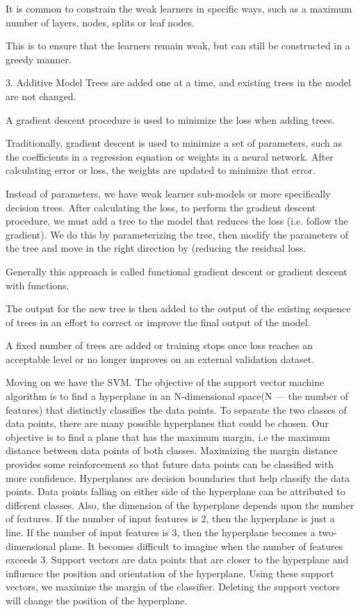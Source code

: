 \documentclass[12pt]{article}
\begin{document}
It is common to constrain the weak learners in specific ways, such as a maximum number of layers, nodes, splits or leaf nodes.

This is to ensure that the learners remain weak, but can still be constructed in a greedy manner.

3. Additive Model
Trees are added one at a time, and existing trees in the model are not changed.

A gradient descent procedure is used to minimize the loss when adding trees.

Traditionally, gradient descent is used to minimize a set of parameters, such as the coefficients in a regression equation or weights in a neural network. After calculating error or loss, the weights are updated to minimize that error.

Instead of parameters, we have weak learner sub-models or more specifically decision trees. After calculating the loss, to perform the gradient descent procedure, we must add a tree to the model that reduces the loss (i.e. follow the gradient). We do this by parameterizing the tree, then modify the parameters of the tree and move in the right direction by (reducing the residual loss.

Generally this approach is called functional gradient descent or gradient descent with functions.

The output for the new tree is then added to the output of the existing sequence of trees in an effort to correct or improve the final output of the model.

A fixed number of trees are added or training stops once loss reaches an acceptable level or no longer improves on an external validation dataset.

Moving on we have the SVM. The objective of the support vector machine algorithm is to find a hyperplane in an N-dimensional space(N — the number of features) that distinctly classifies the data points. To separate the two classes of data points, there are many possible hyperplanes that could be chosen. Our objective is to find a plane that has the maximum margin, i.e the maximum distance between data points of both classes. Maximizing the margin distance provides some reinforcement so that future data points can be classified with more confidence. Hyperplanes are decision boundaries that help classify the data points. Data points falling on either side of the hyperplane can be attributed to different classes. Also, the dimension of the hyperplane depends upon the number of features. If the number of input features is 2, then the hyperplane is just a line. If the number of input features is 3, then the hyperplane becomes a two-dimensional plane. It becomes difficult to imagine when the number of features exceeds 3.
Support vectors are data points that are closer to the hyperplane and influence the position and orientation of the hyperplane. Using these support vectors, we maximize the margin of the classifier. Deleting the support vectors will change the position of the hyperplane.
\end{document}
